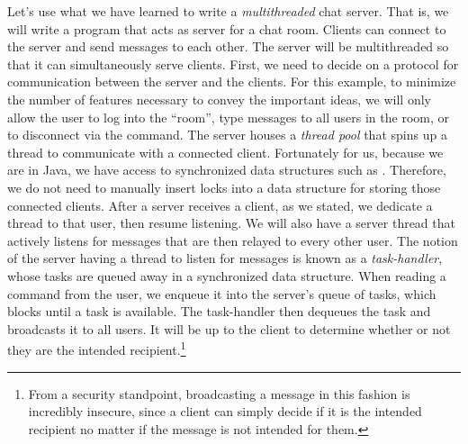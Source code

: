 \example Let's use what we have learned to write a \textit{multithreaded} chat server. That is, we will write a program that acts as server for a chat room. Clients can connect to the server and send messages to each other. The server will be multithreaded so that it can simultaneously serve clients. First, we need to decide on a protocol for communication between the server and the clients. For this example, to minimize the number of features necessary to convey the important ideas, we will only allow the user to log into the ``room'', type messages to all users in the room, or to disconnect via the  command. The server houses a \textit{thread pool} that spins up a thread to communicate with a connected client. Fortunately for us, because we are in Java, we have access to synchronized data structures such as . Therefore, we do not need to manually insert locks into a data structure for storing those connected clients. After a server receives a client, as we stated, we dedicate a thread to that user, then resume listening. We will also have a server thread that actively listens for messages that are then relayed to every other user. The notion of the server having a thread to listen for messages is known as a \textit{task-handler}, whose tasks are queued away in a synchronized  data structure. When reading a command from the user, we enqueue it into the server's queue of tasks, which blocks until a task is available. The task-handler then dequeues the task and broadcasts it to all users. It will be up to the client to determine whether or not they are the intended recipient.\footnote{From a security standpoint, broadcasting a message in this fashion is incredibly insecure, since a client can simply decide if it is the intended recipient no matter if the message is not intended for them.}

